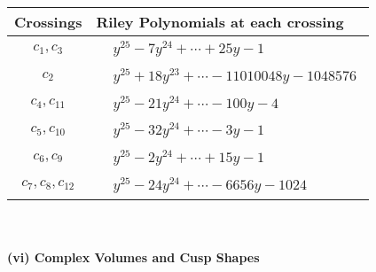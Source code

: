 \documentclass[1p]{elsarticle_modified}
\theoremstyle{definition}
\begin{document}
\begin{tabular}{m{50pt}|m{274pt}}
Crossings & \hspace{64pt}Riley Polynomials at each crossing \\
\hline $$\begin{aligned}c_{1},c_{3}\end{aligned}$$&$\begin{aligned}
&y^{25}-7 y^{24}+\cdots+25 y-1
\end{aligned}$\\
\hline $$\begin{aligned}c_{2}\end{aligned}$$&$\begin{aligned}
&y^{25}+18 y^{23}+\cdots-11010048 y-1048576
\end{aligned}$\\
\hline $$\begin{aligned}c_{4},c_{11}\end{aligned}$$&$\begin{aligned}
&y^{25}-21 y^{24}+\cdots-100 y-4
\end{aligned}$\\
\hline $$\begin{aligned}c_{5},c_{10}\end{aligned}$$&$\begin{aligned}
&y^{25}-32 y^{24}+\cdots-3 y-1
\end{aligned}$\\
\hline $$\begin{aligned}c_{6},c_{9}\end{aligned}$$&$\begin{aligned}
&y^{25}-2 y^{24}+\cdots+15 y-1
\end{aligned}$\\
\hline $$\begin{aligned}c_{7},c_{8},c_{12}\end{aligned}$$&$\begin{aligned}
&y^{25}-24 y^{24}+\cdots-6656 y-1024
\end{aligned}$\\
\hline
\end{tabular}\\~\\
\newpage\flushleft \textbf{(vi) Complex Volumes and Cusp Shapes}
\end{document}
